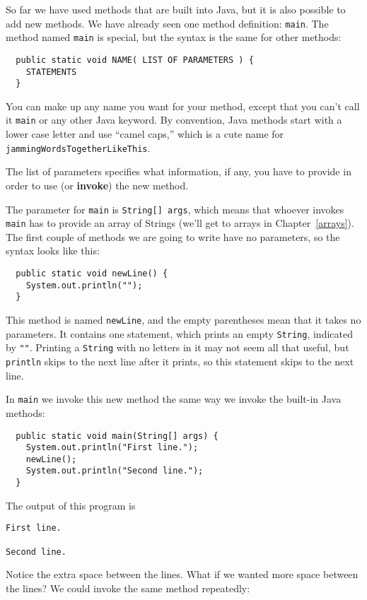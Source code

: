 \documentclass{book}
\begin{document}
So far we have used methods that are built into Java,
but it is also possible to add new methods.  We have already
seen one method definition: {\tt main}.  The method named {\tt main}
is special, but the syntax is the same for other methods:

\begin{verbatim}
  public static void NAME( LIST OF PARAMETERS ) {
    STATEMENTS
  }
\end{verbatim}
%
You can make up any name you want for your method, except
that you can't call it {\tt main} or any other
Java keyword.  By convention, Java methods start with a lower
case letter and use ``camel caps,'' which is a cute name for
{\tt jammingWordsTogetherLikeThis}.

The list of
parameters specifies what information, if any, you have to
provide in order to use (or {\bf invoke}) the new method.


The parameter for {\tt main} is {\tt String[] args}, which
means that whoever invokes {\tt main} has to provide an array of
Strings (we'll get to arrays in Chapter~\ref{arrays}).  The first
couple of methods we are going to write have no parameters, so the
syntax looks like this:

\begin{verbatim}
  public static void newLine() {
    System.out.println("");
  }
\end{verbatim}
%
This method is named {\tt newLine}, and the empty parentheses
mean that it takes no parameters.  It contains one
statement, which prints an empty {\tt String}, indicated by {\tt ""}.
Printing a {\tt String} with no letters in it may not seem all that
useful, but {\tt println} skips to the next
line after it prints, so this statement skips to the next line.

In {\tt main} we invoke this new method the same way we invoke the
built-in Java methods:

\begin{verbatim}
  public static void main(String[] args) {
    System.out.println("First line.");
    newLine();
    System.out.println("Second line.");
  }
\end{verbatim}
%
The output of this program is

\begin{verbatim}
First line.

Second line.
\end{verbatim}
%
Notice the extra space between the lines.  What if we wanted
more space between the lines?  We could invoke the same
method repeatedly:
\end{document}
